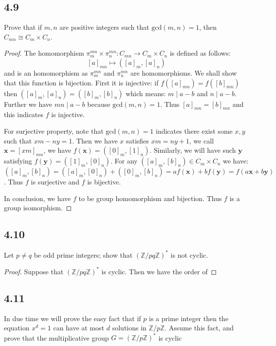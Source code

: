 \documentclass[a4paper, pdf, 12pt]{article}
\newcommand{\divides}{\mid}
\begin{document}
\subsection*{4.9}
Prove that if $m, n$ are positive integers such that $\mbox{gcd}(m, n) = 1$, then
$C_{mn}\cong C_{m}\times C_{n}$.

\begin{proof}
  The homomorphism $\pi_{m}^{mn}\times \pi_{n}^{mn}:C_{mn}\rightarrow C_{m}\times C_{n}$ is defined as follows:
  $$
    [a]_{mn}\mapsto ([a]_{m}, [a]_{n})
  $$ and is an homomorphism as $\pi_{m}^{mn}$ and $\pi_{n}^{mn}$ are homomorphisms.
  We shall show that this function is bijection. First it is injective:
  if $f([a]_{mn}) = f([b]_{mn})$ then $([a]_{m}, [a]_{n}) = ([b]_{m}, [b]_{n})$ which means: $m\divides a - b$ and
  $n\divides a - b$. Further we have $mn \divides a - b$ because $\mbox{gcd}(m,n) = 1$. Thus $[a]_{mn} = [b]_{mn}$ and
  this indicates $f$ is injective.

  For surjective property, note that $\mbox{gcd}(m,n)=1$ indicates there exist some $x, y$ such that $xm - ny = 1$.
  Then we have $x$ satisfies $xm = ny + 1$, we call $\mathbf{x}=[xm]_{mn}$, we have $f(\mathbf{x}) = ([0]_{m}, [1]_{n})$.
  Similarly, we will have such $\mathbf{y}$ satisfying $f(\mathbf{y}) = ([1]_{m}, [0]_{n})$.
  For any $([a]_{m}, [b]_{n})\in C_{m}\times C_{n}$ we have: $([a]_{m}, [b]_{n}) = ([a]_{m}, [0]_{n}) + ([0]_{m}, [b]_{n}) = af(\mathbf{x}) + bf(\mathbf{y})=f(a\mathbf{x}+b\mathbf{y})$.
  Thus $f$ is surjective and $f$ is bijective.

  In conclusion, we have $f$ to be group homomorphism and bijection. Thus $f$ is a group isomorphism.
\end{proof}

\subsection*{4.10}
Let $p \neq q$ be odd prime integers; show that $(\mathbb{Z}/pq\mathbb{Z})^{*}$ is not cyclic.

\begin{proof}
  Suppose that $(\mathbb{Z}/pq\mathbb{Z})^{*}$ is cyclic. Then we have the order of
\end{proof}

\subsection*{4.11}
In due time we will prove the easy fact that if $p$ is a prime integer then
the equation $x^d = 1$ can have at most $d$ solutions in $\mathbb{Z}/p\mathbb{Z}$. Assume this fact, and
prove that the multiplicative group $G = (\mathbb{Z}/p\mathbb{Z})^{*}$ is cyclic
\end{document}
